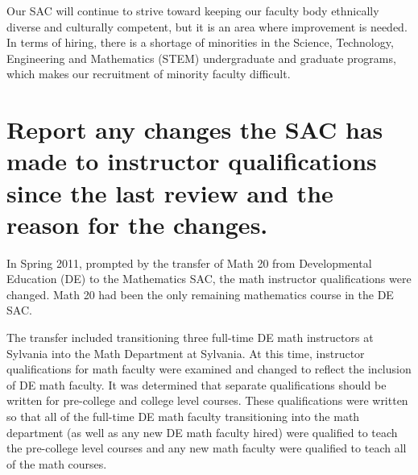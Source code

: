 Our SAC will continue to strive toward keeping our faculty body ethnically
diverse and culturally competent, but it is an area where improvement is
needed. In terms of hiring, there is a shortage of minorities in the Science, Technology, Engineering
and Mathematics (STEM) undergraduate and graduate programs, which makes our
recruitment of minority faculty difficult. \label{reflect:page:stem}





\section[Changes to instructor qualifications]{Report any changes the SAC has made to instructor qualifications since
the last review and the reason for the changes.}
In Spring 2011, prompted by the transfer of Math 20 from Developmental
Education (DE) to the Mathematics SAC, the math instructor qualifications were
changed.  Math 20 had been the only remaining mathematics course in the DE SAC.  

The transfer included transitioning three full-time DE math instructors at
Sylvania into the Math Department at Sylvania.  At this time, instructor
qualifications for math faculty were examined and changed to reflect the
inclusion of DE math faculty.  It was determined that separate qualifications
should be written for pre-college and college level courses.  These
qualifications were written so that all of the full-time DE math faculty
transitioning into the math department (as well as any new DE math faculty
hired) were qualified to teach the pre-college level courses and any new math
faculty were qualified to teach all of the math courses.  

